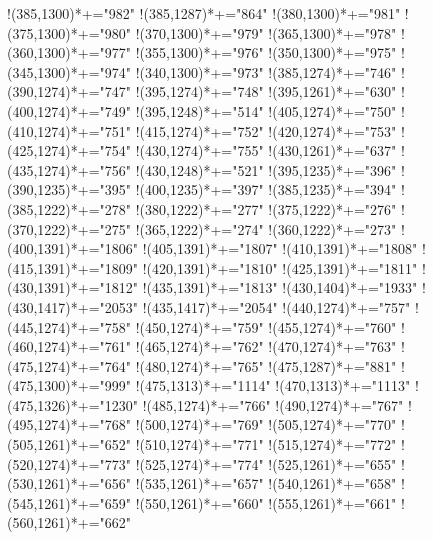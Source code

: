 \documentclass[12pt]{amsart}
\begin{document}
{ !{(385,1300)}*+{\bullet}="982" 
 !{(385,1287)}*+{\bullet}="864" 
 !{(380,1300)}*+{\bullet}="981" 
 !{(375,1300)}*+{\bullet}="980" 
 !{(370,1300)}*+{\bullet}="979" 
 !{(365,1300)}*+{\bullet}="978" 
 !{(360,1300)}*+{\bullet}="977" 
 !{(355,1300)}*+{\bullet}="976" 
 !{(350,1300)}*+{\bullet}="975" 
 !{(345,1300)}*+{\bullet}="974" 
 !{(340,1300)}*+{\bullet}="973" 
 !{(385,1274)}*+{\bullet}="746" 
 !{(390,1274)}*+{\bullet}="747" 
 !{(395,1274)}*+{\bullet}="748" 
 !{(395,1261)}*+{\bullet}="630" 
 !{(400,1274)}*+{\bullet}="749" 
 !{(395,1248)}*+{\bullet}="514" 
 !{(405,1274)}*+{\bullet}="750" 
 !{(410,1274)}*+{\bullet}="751" 
 !{(415,1274)}*+{\bullet}="752" 
 !{(420,1274)}*+{\bullet}="753" 
 !{(425,1274)}*+{\bullet}="754" 
 !{(430,1274)}*+{\bullet}="755" 
 !{(430,1261)}*+{\bullet}="637" 
 !{(435,1274)}*+{\bullet}="756" 
 !{(430,1248)}*+{\bullet}="521" 
 !{(395,1235)}*+{\bullet}="396" 
 !{(390,1235)}*+{\bullet}="395" 
 !{(400,1235)}*+{\bullet}="397" 
 !{(385,1235)}*+{\bullet}="394" 
 !{(385,1222)}*+{\bullet}="278" 
 !{(380,1222)}*+{\bullet}="277" 
 !{(375,1222)}*+{\bullet}="276" 
 !{(370,1222)}*+{\bullet}="275" 
 !{(365,1222)}*+{\bullet}="274" 
 !{(360,1222)}*+{\bullet}="273" 
 !{(400,1391)}*+{\bullet}="1806" 
 !{(405,1391)}*+{\bullet}="1807" 
 !{(410,1391)}*+{\bullet}="1808" 
 !{(415,1391)}*+{\bullet}="1809" 
 !{(420,1391)}*+{\bullet}="1810" 
 !{(425,1391)}*+{\bullet}="1811" 
 !{(430,1391)}*+{\bullet}="1812" 
 !{(435,1391)}*+{\bullet}="1813" 
 !{(430,1404)}*+{\bullet}="1933" 
 !{(430,1417)}*+{\bullet}="2053" 
 !{(435,1417)}*+{\bullet}="2054" 
 !{(440,1274)}*+{\bullet}="757" 
 !{(445,1274)}*+{\bullet}="758" 
 !{(450,1274)}*+{\bullet}="759" 
 !{(455,1274)}*+{\bullet}="760" 
 !{(460,1274)}*+{\bullet}="761" 
 !{(465,1274)}*+{\bullet}="762" 
 !{(470,1274)}*+{\bullet}="763" 
 !{(475,1274)}*+{\bullet}="764" 
 !{(480,1274)}*+{\bullet}="765" 
 !{(475,1287)}*+{\bullet}="881" 
 !{(475,1300)}*+{\bullet}="999" 
 !{(475,1313)}*+{\bullet}="1114" 
 !{(470,1313)}*+{\bullet}="1113" 
 !{(475,1326)}*+{\bullet}="1230" 
 !{(485,1274)}*+{\bullet}="766" 
 !{(490,1274)}*+{\bullet}="767" 
 !{(495,1274)}*+{\bullet}="768" 
 !{(500,1274)}*+{\bullet}="769" 
 !{(505,1274)}*+{\bullet}="770" 
 !{(505,1261)}*+{\bullet}="652" 
 !{(510,1274)}*+{\bullet}="771" 
 !{(515,1274)}*+{\bullet}="772" 
 !{(520,1274)}*+{\bullet}="773" 
 !{(525,1274)}*+{\bullet}="774" 
 !{(525,1261)}*+{\bullet}="655" 
 !{(530,1261)}*+{\bullet}="656" 
 !{(535,1261)}*+{\bullet}="657" 
 !{(540,1261)}*+{\bullet}="658" 
 !{(545,1261)}*+{\bullet}="659" 
 !{(550,1261)}*+{\bullet}="660" 
 !{(555,1261)}*+{\bullet}="661" 
 !{(560,1261)}*+{\bullet}="662" 
}
\end{document}
